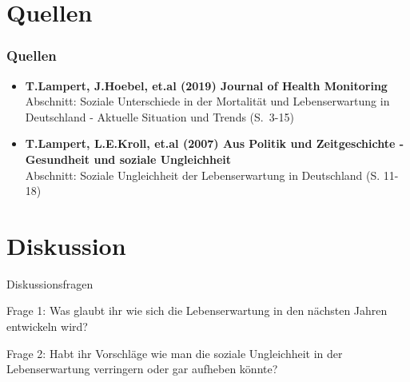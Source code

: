 \documentclass{beamer}
\begin{document}
\section{Quellen}
\begin{frame}
\frametitle{Quellen}
   \begin{itemize}
    \item \textbf{T.Lampert, J.Hoebel, et.al (2019) Journal of Health Monitoring}\\
    Abschnitt: Soziale Unterschiede in der Mortalität und Lebenserwartung in Deutschland - Aktuelle Situation und Trends (S.~3-15)
    
    \item \textbf{T.Lampert, L.E.Kroll, et.al (2007) Aus Politik und Zeitgeschichte - Gesundheit und soziale Ungleichheit}\\
Abschnitt: Soziale Ungleichheit der Lebenserwartung in Deutschland (S. 11-18)

    
    
  \end{itemize}

\end{frame}


\section{Diskussion}
\begin{frame}{Diskussionsfragen}
	\begin{block}{Frage 1:}
		 Was glaubt ihr wie sich die Lebenserwartung in den nächsten Jahren entwickeln wird?
	\end{block}
	\pause  %
	\begin{block}{Frage 2:}
		 Habt ihr Vorschläge wie man die soziale Ungleichheit in der Lebenserwartung verringern oder gar aufheben könnte?
	\end{block}
\end{frame}
\end{document}
